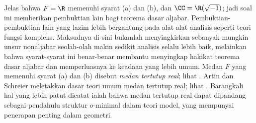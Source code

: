 \begin{Exercises}
		Jelas bahwa $F=\R$ memenuhi syarat (a) dan (b), dan $\CC = \R(\sqrt{-1})$; jadi soal ini memberikan pembuktian lain bagi teorema dasar aljabar. Pembuktian-pembuktian lain yang lazim lebih bergantung pada alat-alat analisis seperti teori fungsi kompleks. Maksudnya di sini bukanlah menyingkirkan sebanyak mungkin unsur nonaljabar seolah-olah makin sedikit analisis selalu lebih baik, melainkan bahwa syarat-syarat ini benar-benar membantu menyingkap hakikat teorema dasar aljabar dan memperluasnya ke keadaan yang lebih umum. Medan $F$ yang memenuhi syarat (a) dan (b) disebut \emph{medan tertutup real}; lihat \cite[Bab 9]{Feng17}. Artin dan Schreier meletakkan dasar teori umum medan tertutup real; lihat \cite[Bab XI]{Lang02}. Barangkali hal yang lebih patut dicatat ialah bahwa medan tertutup real dapat dipandang sebagai pendahulu struktur $o$-minimal dalam teori model, yang mempunyai penerapan penting dalam geometri. 
\end{Exercises}
